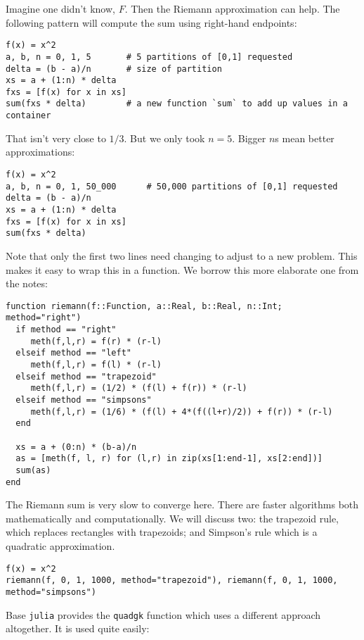 \documentclass[12pt]{article}
\begin{document}
Imagine one didn't know, $F$. Then the Riemann approximation can help.
The following pattern will compute the sum using right-hand endpoints:



\begin{verbatim}
f(x) = x^2
a, b, n = 0, 1, 5       # 5 partitions of [0,1] requested
delta = (b - a)/n       # size of partition
xs = a + (1:n) * delta  
fxs = [f(x) for x in xs]
sum(fxs * delta)        # a new function `sum` to add up values in a container
\end{verbatim}
That isn't very close to $1/3$. But we only took $n=5$. Bigger $n$s mean
better approximations:



\begin{verbatim}
f(x) = x^2
a, b, n = 0, 1, 50_000      # 50,000 partitions of [0,1] requested
delta = (b - a)/n       
xs = a + (1:n) * delta  
fxs = [f(x) for x in xs]
sum(fxs * delta)
\end{verbatim}
Note that only the first two lines need changing to adjust to a new
problem. This makes it easy to wrap this in a function. We borrow this
more elaborate one from the notes:



\begin{verbatim}
function riemann(f::Function, a::Real, b::Real, n::Int; method="right")
  if method == "right"
     meth(f,l,r) = f(r) * (r-l)
  elseif method == "left"
     meth(f,l,r) = f(l) * (r-l)
  elseif method == "trapezoid"
     meth(f,l,r) = (1/2) * (f(l) + f(r)) * (r-l)
  elseif method == "simpsons"
     meth(f,l,r) = (1/6) * (f(l) + 4*(f((l+r)/2)) + f(r)) * (r-l)
  end

  xs = a + (0:n) * (b-a)/n
  as = [meth(f, l, r) for (l,r) in zip(xs[1:end-1], xs[2:end])]
  sum(as)
end
\end{verbatim}
The Riemann sum is very slow to converge here. There are faster
algorithms both mathematically and computationally. We will discuss two:
the trapezoid rule, which replaces rectangles with trapezoids; and
Simpson's rule which is a quadratic approximation.



\begin{verbatim}
f(x) = x^2
riemann(f, 0, 1, 1000, method="trapezoid"), riemann(f, 0, 1, 1000, method="simpsons")
\end{verbatim}
Base \texttt{julia} provides the \texttt{quadgk} function which uses a
different approach altogether. It is used quite easily:
\end{document}
